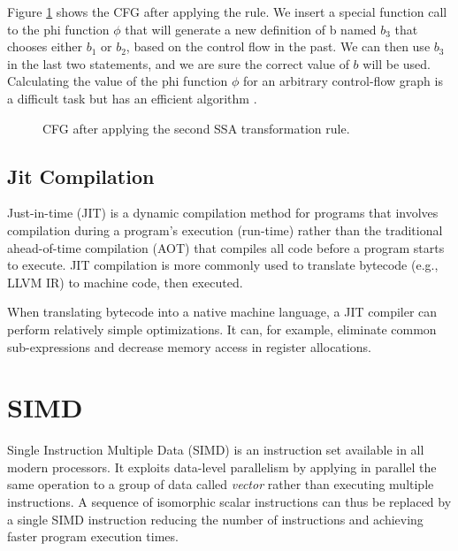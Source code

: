Figure \ref{fig:cfg3} shows the CFG after applying the rule. We insert a special function call to the phi function $\phi$ that will generate a new definition of b named $b_3$ that chooses either $b_1$ or $b_2$, based on the control flow in the past. We can then use $b_3$ in the last two statements, and we are sure the correct value of $b$ will be used.
Calculating the value of the phi function $\phi$ for an arbitrary control-flow graph is a difficult task but has an efficient algorithm \cite{domalgo}.

\begin{figure}[htbp]
\centering
\usetikzlibrary{shapes,calc}
\caption{CFG after applying the second SSA transformation rule.}
\label{fig:cfg3}
\end{figure}


\subsection{Jit Compilation}
Just-in-time (JIT) is a dynamic compilation method for programs that involves compilation during a program's execution (run-time) rather than the traditional ahead-of-time compilation (AOT) that compiles all code before a program starts to execute. JIT compilation is more commonly used to translate bytecode (e.g., LLVM IR) to machine code, then executed.

When translating bytecode into a native machine language, a JIT compiler can perform relatively simple optimizations. It can, for example, eliminate common sub-expressions and decrease memory access in register allocations.

\section{SIMD}
Single Instruction Multiple Data (SIMD) is an instruction set available in all modern processors. It exploits data-level parallelism by applying in parallel the same operation to a group of data called \textit{vector} rather than executing multiple instructions. A sequence of isomorphic scalar instructions can thus be replaced by a single SIMD instruction reducing the number of instructions and achieving faster program execution times.

